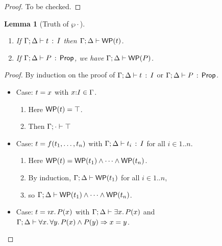 \documentclass[10pt,a4paper]{article}
\newtheorem{lemma}[theorem]{Lemma}
\begin{document}
\begin{proof}
To be checked.
\end{proof}

\clearpage

\begin{lemma}[Truth of $\wp{\cdot}$]
\mbox{}
  \begin{enumerate}
  \item If $\Gamma;\Delta \vdash t\, :\, I$ then
    $\Gamma;\Delta \vdash \mathop{\mathsf{WP}}(t)$.
  \item If $\Gamma;\Delta \vdash P\, :\, \mathsf{Prop}$, we have
    $\Gamma;\Delta \vdash \mathop{\mathsf{WP}}(P)$.
  \end{enumerate}
\end{lemma}

\begin{proof}
  \raggedright By induction on the proof of
  $\Gamma;\Delta \vdash t\, :\, I$ or $\Gamma;\Delta \vdash P\, :\, \mathsf{Prop}$.
  \begin{itemize}
  \item Case: $t = x$ with $x{:}I\in\Gamma$.  
    \begin{enumerate}
      \item
        Here $\mathop{\mathsf{WP}}(t) = \top$.
      \item
        Then $\Gamma;\cdot \vdash \top$ 
      \end{enumerate}
  \item Case: $t = f({t}_1,\ldots,{t}_{n})$ with
    $\Gamma;\Delta \vdash t_i\, :\, I$ for all $i\in1..n$.
    \begin{enumerate}
    \item
      Here $\mathop{\mathsf{WP}}(t) =
      \mathop{\mathsf{WP}}(t_1) \wedge \cdots \wedge \mathop{\mathsf{WP}}(t_n)$.
    \item 
    	By induction,
      $\Gamma;\Delta \vdash \mathop{\mathsf{WP}}(t_1)$ for
      all $i\in1..n$, 
    \item 
    	so
    $\Gamma;\Delta \vdash \mathop{\mathsf{WP}}(t_1) \wedge \cdots \wedge \mathop{\mathsf{WP}}(t_n)$.
    \end{enumerate}
    
  \item Case: $\t = \tDesc{\x}{\I}{\p(\x)}$ with
  $\Gamma;\Delta \vdash \exists x.\, P(x)$ and 
  $\Gamma;\Delta \vdash \forall x.\, \forall y.\, P(x) \wedge P(y) \Rightarrow x=y$.


\end{itemize}
\end{proof}
\end{document}

